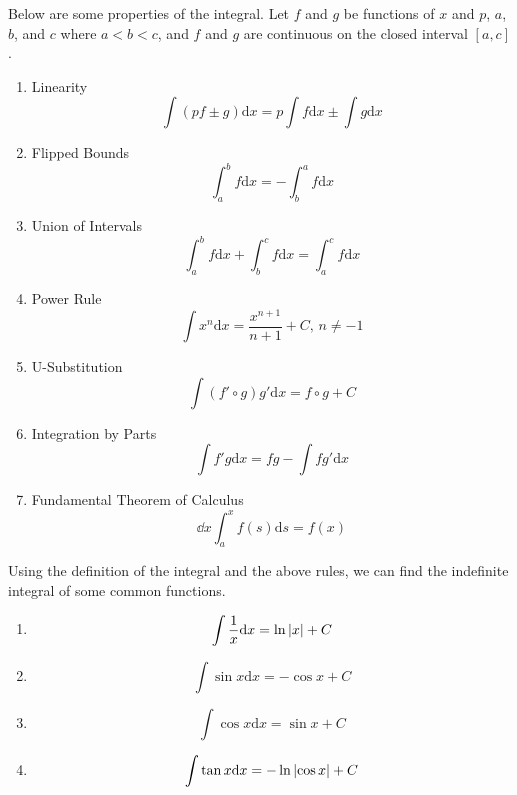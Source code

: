 \noindent
Below are some properties of the integral. Let $f$ and $g$ be functions of $x$ and $p$, $a$, $b$, and $c$ where $a < b < c$, and $f$ and $g$ are continuous on the closed interval $[a,c]$.
\begin{enumerate}[label=]
	\item Linearity
	\begin{equation*}
		\int{(pf \pm g) \mathrm{d}x} = p\int{f \mathrm{d}x} \pm \int{g \mathrm{d}x}
	\end{equation*}
	\item Flipped Bounds
	\begin{equation*}
		\int_{a}^{b}{f \mathrm{d}x} = -\int_{b}^{a}{f \mathrm{d}x}
	\end{equation*}
	\item Union of Intervals
	\begin{equation*}
		\int_{a}^{b}{f \mathrm{d}x} + \int_{b}^{c}{f \mathrm{d}x} = \int_{a}^{c}{f \mathrm{d}x}
	\end{equation*}
	\item Power Rule
	\begin{equation*}
		\int{x^n \mathrm{d}x} = \frac{x^{n+1}}{n+1} + C \text{, }n \neq -1
	\end{equation*}
	\item U-Substitution
	\begin{equation*}
		\int{\left(f'\circ g\right) g' \mathrm{d}x} = f\circ g+ C
	\end{equation*}
	\item Integration by Parts
	\begin{equation*}
		\int{f' g \mathrm{d}x} = fg - \int{fg' \mathrm{d}x}
	\end{equation*}
	\item Fundamental Theorem of Calculus
	\begin{equation*}
		\dd{x}\int_{a}^{x}{f(s) \mathrm{d}s} = f(x)
	\end{equation*}
\end{enumerate}
Using the definition of the integral and the above rules, we can find the indefinite integral of some common functions.
\begin{enumerate}[label=]
	\item 
	\begin{equation*}
	\int{\frac{1}{x} \mathrm{d}x} = \ln{\lvert x \rvert} + C
	\end{equation*}
	\item 
	\begin{equation*}
	\int{\sin{x} \mathrm{d}x} = -\cos{x} + C
	\end{equation*}
	\item 
	\begin{equation*}
	\int{\cos{x} \mathrm{d}x} = \sin{x} + C
	\end{equation*}
	\item 
	\begin{equation*}
	\int{\tan{x} \mathrm{d}x} = -\ln{\lvert \cos{x} \rvert} + C
	\end{equation*}
\end{enumerate}